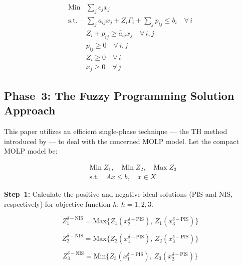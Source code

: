 \documentclass[10pt,twocolumn]{article}
\begin{document}
\begin{equation}
\begin{aligned}
  \text{Min} &\sum_j c_j x_j \\
  \text{s.t.} &\sum_j a_{ij} x_j + Z_i \Gamma_i
               + \sum_j p_{ij} \le b_i \quad \forall\, i \\
              &Z_i + p_{ij} \ge \hat{a}_{ij} x_j \quad \forall\, i,j \\
              &p_{ij} \ge 0 \quad \forall\, i,j \\
              &Z_i \ge 0 \quad \forall\, i \\
              &x_j \ge 0 \quad \forall\, j
\end{aligned}
\label{eq:robust_lp}
\end{equation}

\subsection{Phase~3: The Fuzzy Programming Solution Approach}

This paper utilizes an efficient single-phase technique — the TH
method introduced by \citet{Torabi2008} — to deal with the concerned
MOLP model. Let the compact MOLP model be:

\begin{equation}
\begin{aligned}
  &\text{Min}\; Z_1,\quad \text{Min}\; Z_2,\quad \text{Max}\; Z_3 \\
  &\text{s.t.}\quad Ax \le b,\quad x \in X
\end{aligned}
\label{eq:molp}
\end{equation}

\textbf{Step~1:} Calculate the positive and negative ideal solutions
(PIS and NIS, respectively) for objective function $h$; $h = 1, 2,
3$.

\begin{equation}
Z_1^{\delta-\text{NIS}} = \text{Max}\{Z_1(x_2^{\delta-\text{PIS}}),\,
Z_1(x_3^{\delta-\text{PIS}})\}
\label{eq:nis1}
\end{equation}

\begin{equation}
Z_2^{\delta-\text{NIS}} = \text{Max}\{Z_2(x_1^{\delta-\text{PIS}}),\,
Z_2(x_3^{\delta-\text{PIS}})\}
\label{eq:nis2}
\end{equation}

\begin{equation}
Z_3^{\delta-\text{NIS}} = \text{Min}\{Z_3(x_1^{\delta-\text{PIS}}),\,
Z_3(x_2^{\delta-\text{PIS}})\}
\label{eq:nis3}
\end{equation}
\end{document}
